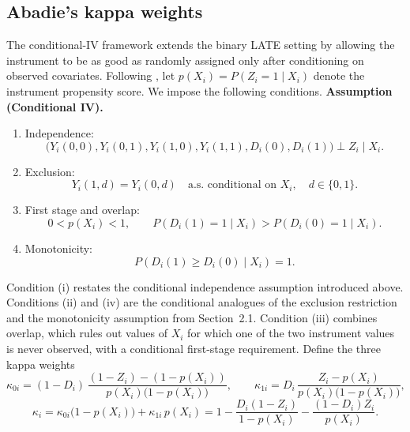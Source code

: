 \documentclass[12pt, a4paper, oneside]{article}
\theoremstyle{plain}
\theoremstyle{definition}
\begin{document}
\subsection{Abadie's kappa weights}

The conditional-IV framework extends the binary LATE setting by allowing the instrument
to be as good as randomly assigned only after conditioning on observed covariates.
Following \citet{abadie2003semiparametric}, let
$p(X_i)=P(Z_i=1\mid X_i)$ denote the instrument propensity score. We impose the following conditions.
\textbf{Assumption (Conditional IV).}
\begin{enumerate}
    \item[(i)] Independence:
    \[
    \big(Y_i(0,0),Y_i(0,1),Y_i(1,0),Y_i(1,1),D_i(0),D_i(1)\big)
    \perp Z_i \mid X_i.
    \]
    \item[(ii)] Exclusion:
    \[
    Y_i(1,d)=Y_i(0,d) \quad \text{a.s. conditional on } X_i,\quad d\in\{0,1\}.
    \]
    \item[(iii)] First stage and overlap:
    \[
    0<p(X_i)<1,\qquad
    P(D_i(1)=1\mid X_i)>P(D_i(0)=1\mid X_i).
    \]
    \item[(iv)] Monotonicity:
    \[
    P(D_i(1)\geq D_i(0)\mid X_i)=1.
    \]
\end{enumerate}
Condition (i) restates the conditional independence assumption introduced above. Conditions (ii) and (iv) are the conditional analogues of the exclusion restriction and the monotonicity assumption from Section~2.1. Condition (iii) combines overlap, which rules out values of $X_i$ for which one of the two instrument values is never observed, with a conditional first-stage requirement.
Define the three kappa weights
\begin{equation}
    \kappa_{0i} = (1-D_i)\,\frac{(1-Z_i)-(1-p(X_i))}{p(X_i)\big(1-p(X_i)\big)}, \qquad
    \kappa_{1i} = D_i\,\frac{Z_i-p(X_i)}{p(X_i)\big(1-p(X_i)\big)},
\end{equation}
\begin{equation}
    \kappa_i = \kappa_{0i}\big(1-p(X_i)\big)+\kappa_{1i}\,p(X_i) = 1-\frac{D_i(1-Z_i)}{1-p(X_i)}-\frac{(1-D_i)Z_i}{p(X_i)}.
\end{equation}
\end{document}
